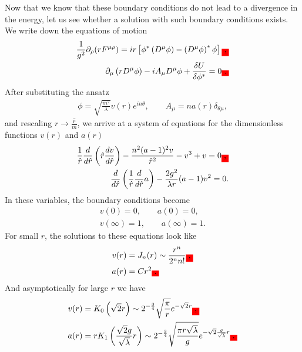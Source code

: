     Now that we know that these boundary conditions do not lead to a divergence in the energy, let us see whether a solution with such boundary conditions exists. We write down the equations of motion\colorbox{red}{ }
    \begin{align}
        \frac{1}{g^2}  \partial_{\rho}(r F^{\mu \rho}) = i r \left[\phi^* \left(D^{\mu}\phi\right) - \left(D^{\mu}\phi \right)^* \phi \right]\colorbox{red}{,} \nonumber \\
        \partial_{\mu} \left(r D^{\mu} \phi \right) - i A_{\mu} D^{\mu} \phi + \frac{\delta U}{\delta \phi^*} =0\colorbox{red}{.}
    \end{align}
    After substituting the ansatz
    \begin{align}
        \phi = \sqrt{\frac{m^2}{\lambda}}v(r) e^{i n \theta}, \qquad A_{\mu} = n a(r) \delta_{\theta \mu},
    \end{align}
    and rescaling $r\rightarrow \frac{\hat{r}}{m}$, we arrive at a system of equations for the dimensionless functions $v(r)$ and $a(r)$\colorbox{red}{ }
    \begin{align}
        \frac{1}{\hat{r}} \frac{d }{d \hat{r}} \left(\hat{r} \frac{d v}{d \hat{r}} \right) - \frac{n^2 (a-1)^2 v}{\hat{r}^2} -v^3 +v =0\colorbox{red}{,}  \\
        \frac{d}{d \hat{r}}\left(\frac{1}{\hat{r}}\frac{d}{d \hat{r}} a \right)- \frac{2 g^2}{\lambda r} (a-1)v^2=0.
    \end{align}
    In these variables, the boundary conditions become
    \begin{align}
        v(0) = 0, \qquad a(0)=0, \\
        v(\infty) =1, \qquad a(\infty) =1.
    \end{align}
    For small $r$, the solutions to these equations look like
    \begin{align}
        v(r)&= J_n(r) \sim \frac{r^n}{ 2^n n!}\colorbox{red}{,} \\
        a(r)&= C r^2\colorbox{red}{.}
    \end{align}
    And asymptotically for large $r$ we have
    \begin{align}
        v(r)&=K_0\left(\sqrt{2} r\right)\sim 2^{-\frac{3}{4}}\sqrt{\frac{\pi}{r}} e^{- \sqrt{2} r} \colorbox{red}{,} \label{eq:Asymptotics1_Abelian_Higgs} \\
        a(r)&=r K_1\left(\frac{\sqrt{2} g}{\sqrt{\lambda}} r \right)\sim 2^{- \frac{3}{4}} \sqrt{\frac{\pi r \sqrt{\lambda}}{g}} e^{- \sqrt{2} \frac{g}{\sqrt{\lambda}}r}\colorbox{red}{.} \label{eq:Asymptotics2_Abelian_Higgs}
    \end{align}

